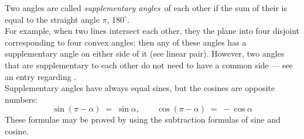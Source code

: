 \documentclass[12pt]{article}
\theoremstyle{definition}
\begin{document}
Two angles are called {\em supplementary angles}\, of each other if the sum of their  is equal to the straight angle $\pi$,  $180^\circ$.\\

For example, when two lines intersect each other, they  the plane into four disjoint  corresponding to four convex angles; then any of these angles has a supplementary angle on either side of it (see linear pair).  However, two angles that are supplementary to each other do not need to have a common side --- see  an entry regarding .\\

Supplementary angles have always equal sines, but the cosines are opposite numbers:
$$\sin(\pi\!-\!\alpha) \;=\; \sin\alpha, \qquad \cos(\pi\!-\!\alpha) \;=\; -\cos\alpha$$
These formulae may be proved by using the subtraction formulas of sine and cosine.


\end{document}
